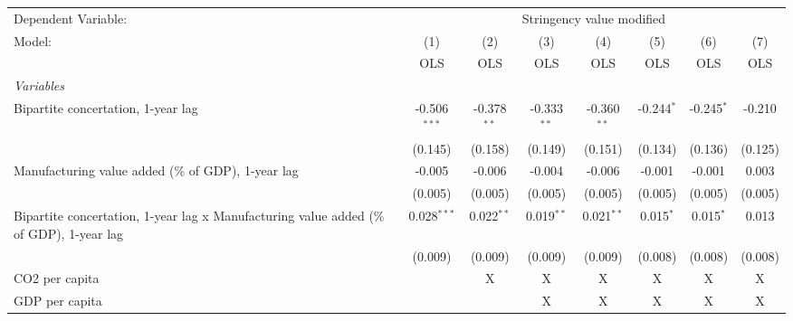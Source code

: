 
\begingroup
\centering
\begin{tabular}{lccccccc}
   \toprule
   Dependent Variable: & \multicolumn{7}{c}{Stringency value modified}\\
   Model:                                                                                  & (1)            & (2)           & (3)           & (4)           & (5)          & (6)          & (7)\\  
                                                                                           &  OLS           & OLS           & OLS           & OLS           & OLS          & OLS          & OLS\\  
   \midrule
   \emph{Variables}\\
   Bipartite concertation, 1-year lag                                                      & -0.506$^{***}$ & -0.378$^{**}$ & -0.333$^{**}$ & -0.360$^{**}$ & -0.244$^{*}$ & -0.245$^{*}$ & -0.210\\   
                                                                                           & (0.145)        & (0.158)       & (0.149)       & (0.151)       & (0.134)      & (0.136)      & (0.125)\\   
   Manufacturing value added (\% of GDP), 1-year lag                                       & -0.005         & -0.006        & -0.004        & -0.006        & -0.001       & -0.001       & 0.003\\   
                                                                                           & (0.005)        & (0.005)       & (0.005)       & (0.005)       & (0.005)      & (0.005)      & (0.005)\\   
   Bipartite concertation, 1-year lag x Manufacturing value added (\% of GDP), 1-year lag  & 0.028$^{***}$  & 0.022$^{**}$  & 0.019$^{**}$  & 0.021$^{**}$  & 0.015$^{*}$  & 0.015$^{*}$  & 0.013\\   
                                                                                           & (0.009)        & (0.009)       & (0.009)       & (0.009)       & (0.008)      & (0.008)      & (0.008)\\   
   CO2 per capita                                                                          &                & X             & X             & X             & X            & X            & X\\  
   GDP per capita                                                                          &                &               & X             & X             & X            & X            & X\\  

\end{tabular}

